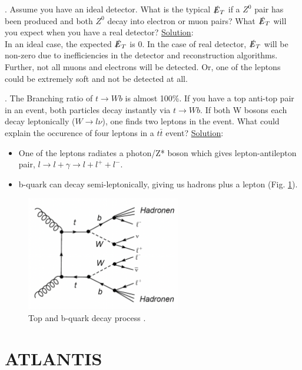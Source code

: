 \documentclass[a4paper]{report}
\numberwithin{equation}{section}
\begin{document}
\bigbreak

. Assume you have an ideal detector. What is the typical $\slashed{E}_T$ if a $Z^0$ pair has been produced and both $Z^0$ decay into electron or muon pairs? What $\slashed{E}_T$ will you expect when you have a real detector?
\bigbreak
\noindent \underline{Solution}: \\
\noindent In an ideal case, the expected $\slashed{E}_T$ is 0. In the case of real detector, $\slashed{E}_T$ will be non-zero due to inefficiencies in the detector and reconstruction algorithms. Further, not all muons and electrons will be detected. Or, one of the leptons could be extremely soft and not be detected at all. 

\bigbreak

. The Branching ratio of $t \rightarrow W b$ is almost 100\%. If you have a top anti-top pair in an event, both particles decay instantly via $t \rightarrow W b$. If both W bosons each decay leptonically ($W \rightarrow l \nu$), one finds two leptons in the event. What could explain the occurence of four leptons in a $t \bar{t}$ event?
\bigbreak
\noindent \underline{Solution}: \\
\begin{itemize}
	\item One of the leptons radiates a photon/Z* boson which gives lepton-antilepton pair, $l \rightarrow l + \gamma \rightarrow l + l^+ + l^-$.
	\item b-quark can decay semi-leptonically, giving us hadrons plus a lepton (Fig. \ref{fig:bdecay}).
\end{itemize}

\begin{figure}[htpb]
    \centering
    \includegraphics[width=0.6\textwidth]{bdecay}
    \caption{Top and b-quark decay process \cite{labman}.}
    \label{fig:bdecay}
\end{figure}

\chapter{ATLANTIS} \label{chap:atlantis}
\end{document}
